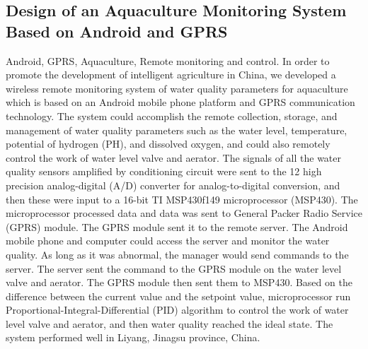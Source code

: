 \documentclass[12pt]{article}
\begin{document}
				\subsection*{Design of an Aquaculture Monitoring System Based on Android and GPRS}	
				Android, GPRS, Aquaculture, Remote monitoring and control.
In order to promote the development of intelligent agriculture in China, we developed a wireless remote monitoring system of water quality parameters for aquaculture which is based on an Android mobile phone platform and GPRS communication technology. The system could accomplish the remote collection, storage, and management of water quality parameters such as the water level, temperature, potential of hydrogen (PH), and dissolved oxygen, and could also remotely control the work of water level valve and aerator. The signals of all the water quality sensors amplified by conditioning circuit were sent to the 12 high precision analog-digital (A/D) converter for analog-to-digital conversion, and then these were input to a 16-bit TI MSP430f149 microprocessor (MSP430). The microprocessor processed data and data was sent to General Packer Radio Service (GPRS) module. The GPRS module sent it to the remote server. The Android mobile phone and computer could access the server and monitor the water quality. As long as it was abnormal, the manager would send commands to the server. The server sent the command to the GPRS module on the water level valve and aerator. The GPRS module then sent them to MSP430. Based on the difference between the current value and the setpoint value, microprocessor run Proportional-Integral-Differential (PID) algorithm to control the work of water level valve and aerator, and then water quality reached the ideal state. The system performed well in Liyang, Jinagsu province, China. 
\end{document}
